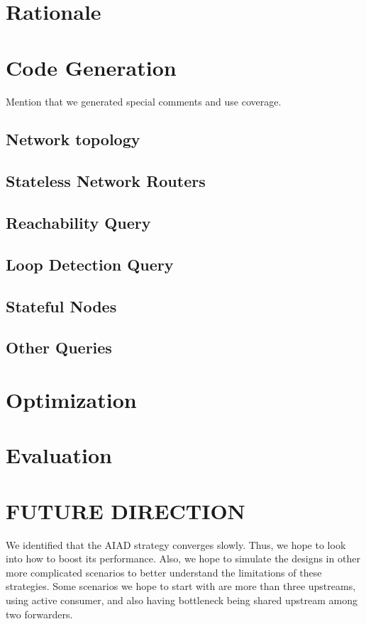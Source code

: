 \documentclass[letterpaper, 10 pt, conference]{ieeeconf}  %
\begin{document}
\section{Rationale}\label{sec:rationale}

\section{Code Generation}\label{sec:codegen}

Mention that we generated special comments and use coverage.

\subsection{Network topology}

\subsection{Stateless Network Routers}

\subsection{Reachability Query}

\subsection{Loop Detection Query}

\subsection{Stateful Nodes}

\subsection{Other Queries}

\section{Optimization}\label{sec:opt}

\section{Evaluation}\label{sec:eval}

\section{FUTURE DIRECTION}\label{sec:fd}
We identified that the AIAD strategy converges slowly. Thus, we hope to look into how to boost its performance. Also, we hope to simulate the designs in other more complicated scenarios to better understand the limitations of these strategies. Some scenarios we hope to start with are more than three upstreams, using active consumer, and also having bottleneck being shared upstream among two forwarders.
\end{document}
